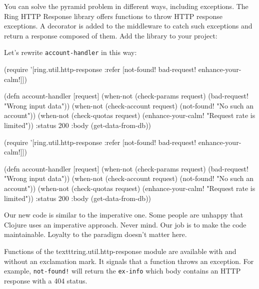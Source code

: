 
You can solve the pyramid problem in different ways, including exceptions. The Ring HTTP Response library offers functions to throw HTTP response exceptions. A decorator is added to the middleware to catch such exceptions and return a response composed of them. Add the library to your project:

\begin{clojure}
\end{clojure}

Let's rewrite \verb|account-handler| in this way:


\ifx\DEVICETYPE\MOBILE

\begin{clojure}
(require '[ring.util.http-response
           :refer [not-found!
                   bad-request!
                   enhance-your-calm!]])

(defn account-handler [request]
  (when-not (check-params request)
    (bad-request! "Wrong input data"))
  (when-not (check-account request)
    (not-found! "No such an account"))
  (when-not (check-quotas request)
    (enhance-your-calm!
      "Request rate is limited"))
  {:status 200
   :body (get-data-from-db)})
\end{clojure}

\else

\begin{clojure}
(require '[ring.util.http-response
           :refer [not-found!
                   bad-request!
                   enhance-your-calm!]])

(defn account-handler [request]
  (when-not (check-params request)
    (bad-request! "Wrong input data"))
  (when-not (check-account request)
    (not-found! "No such an account"))
  (when-not (check-quotas request)
    (enhance-your-calm! "Request rate is limited"))
  {:status 200
   :body (get-data-from-db)})
\end{clojure}

\fi

Our new code is similar to the imperative one. Some people are unhappy that Clojure uses an imperative approach. Never mind. Our job is to make the code maintainable. Loyalty to the paradigm doesn't matter here.

Functions of the texttt{ring.util.http\--res\-ponse} module are available with and without an exclamation mark. It signals that a function throws an exception. For example, \verb|not-found!| will return the \verb|ex-info| which body contains an HTTP response with a 404 status.


